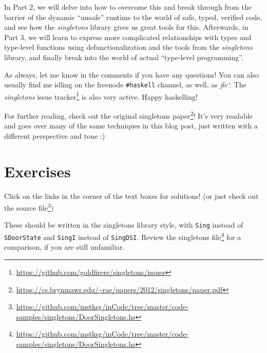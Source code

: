 \documentclass[]{article}
\renewcommand{\href}[2]{#2\footnote{\url{#1}}}
\begin{document}
In Part 2, we will delve into how to overcome this and break through from the
barrier of the dynamic ``unsafe'' runtime to the world of safe, typed, verified
code, and see how the \emph{singletons} library gives us great tools for this.
Afterwards, in Part 3, we will learn to express more complicated relationships
with types and type-level functions using defunctionalization and the tools from
the \emph{singletons} library, and finally break into the world of actual
``type-level programming''.

As always, let me know in the comments if you have any questions! You can also
usually find me idling on the freenode \texttt{\#haskell} channel, as well, as
\emph{jle`}. The \emph{singletons}
\href{https://github.com/goldfirere/singletons/issues}{issue tracker} is also
very active. Happy haskelling!

For further reading, check out the
\href{https://cs.brynmawr.edu/~rae/papers/2012/singletons/paper.pdf}{original
singletons paper}! It's very readable and goes over many of the same techniques
in this blog post, just written with a different perspective and tone :)

\hypertarget{exercises}{%
\section{Exercises}\label{exercises}}

Click on the links in the corner of the text boxes for solutions! (or just check
out
\href{https://github.com/mstksg/inCode/tree/master/code-samples/singletons/DoorSingletons.hs}{the
source file})

These should be written in the singletons library style, with \texttt{Sing}
instead of \texttt{SDoorState} and \texttt{SingI} instead of \texttt{SingDSI}.
Review the
\href{https://github.com/mstksg/inCode/tree/master/code-samples/singletons/DoorSingletons.hs}{singletons
file} for a comparison, if you are still unfamiliar.
\end{document}
